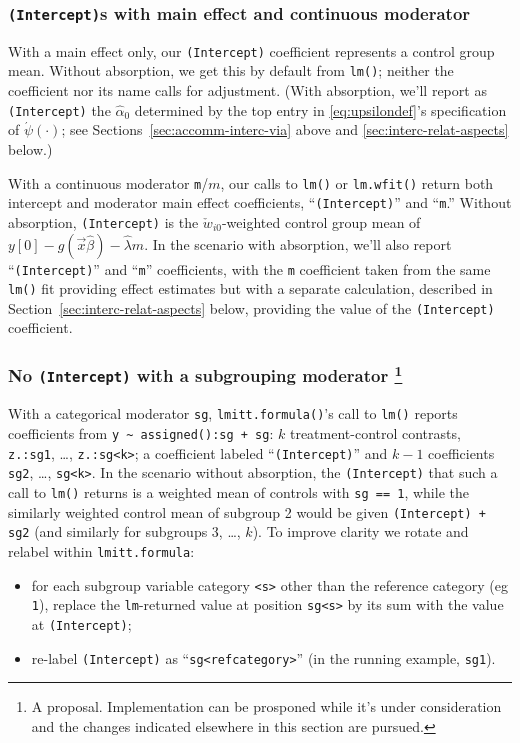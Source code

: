 \documentclass{article}
\newcommand{\owt}[1][{[z_{i}]}]{\ensuremath{\check{w}_{i#1}}}
\begin{document}
\subsubsection{\texttt{(Intercept)}s with main effect and continuous
  moderator}
With a main effect only, our \texttt{(Intercept)} coefficient
represents a control group mean. Without absorption, we get this by
default from \texttt{lm()}; neither the
coefficient nor its name calls for adjustment.  (With absorption, we'll
report as \texttt{(Intercept)} the $\hat{\alpha}_{0}$ determined by
the top entry in \eqref{eq:upsilondef}'s specification of
$\acute{\psi}(\cdot)$; see Sections~\ref{sec:accomm-interc-via} above
and \ref{sec:interc-relat-aspects} below.)

With a continuous moderator \texttt{m}/$m$, our calls to \texttt{lm()} or
\texttt{lm.wfit()} return both intercept and moderator main
effect coefficients, ``\texttt{(Intercept)}'' and ``\texttt{m}.''
Without absorption, \texttt{(Intercept)} is the $\owt[0]$-weighted control group mean of $y[0] - g(\vec{x}\hat\beta) -
\hat{\lambda}m$. In the scenario with absorption, we'll also report
``\texttt{(Intercept)}'' and ``\texttt{m}'' coefficients, with the
\texttt{m} coefficient taken from the same \texttt{lm()} fit providing
effect estimates but with a separate calculation, described in Section~\ref{sec:interc-relat-aspects} below,
providing the value of the \texttt{(Intercept)} coefficient. 

\subsubsection{No \texttt{(Intercept)} with a subgrouping
  moderator%
  \protect\footnote{A proposal. Implementation can be prosponed while
  it's under consideration and the changes indicated elsewhere in this
  section are pursued.}%
}
With a categorical moderator \texttt{sg}, \texttt{lmitt.formula()}'s call to
\texttt{lm()} reports coefficients from \texttt{y
  \textasciitilde\ assigned():sg + sg}: $k$ treatment-control contrasts,
\texttt{z.:sg1}, \ldots, \texttt{z.:sg<k>}; a
coefficient labeled ``\texttt{(Intercept)}'' and $k-1$
coefficients \texttt{sg2}, \ldots, \texttt{sg<k>}.  In the scenario
without absorption, the \texttt{(Intercept)} that such a call to \texttt{lm()}
returns is a weighted mean of
controls with \texttt{sg == 1}, while the similarly weighted control mean
of subgroup 2 would be given \texttt{(Intercept)
+ sg2} (and similarly for subgroups 3, \ldots, $k$).
To improve clarity we rotate and relabel within \texttt{lmitt.formula}:
\begin{itemize}
\item for each subgroup variable category \texttt{<s>} other than the
  reference category (eg \texttt{1}), replace the \texttt{lm}-returned value at
  position \texttt{sg<s>} by its sum with the value at
  \texttt{(Intercept)}; 
\item re-label \texttt{(Intercept)} as
  ``\texttt{sg<refcategory>}'' (in the running
  example, \texttt{sg1}).
\end{itemize}
\end{document}
